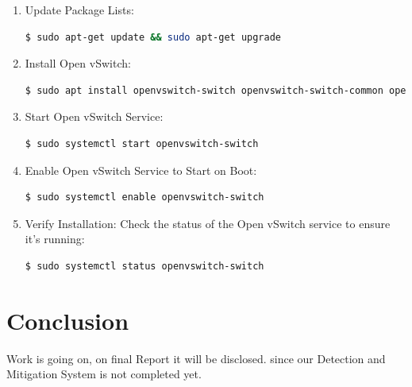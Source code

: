 \documentclass[12pt,twocolumn]{article}
\begin{document}
\begin{enumerate}
    \item Update Package Lists:
        \begin{lstlisting}[language=bash]
            $ sudo apt-get update && sudo apt-get upgrade
        \end{lstlisting}

    \item Install Open vSwitch:
        \begin{lstlisting}[language=bash]
            $ sudo apt install openvswitch-switch openvswitch-switch-common openvswitch-switch-ldpg
        \end{lstlisting}
    \item Start Open vSwitch Service:
        \begin{lstlisting}[language=bash]
           $ sudo systemctl start openvswitch-switch
        \end{lstlisting}
        
    \item Enable Open vSwitch Service to Start on Boot:
        \begin{lstlisting}[language=bash]
           $ sudo systemctl enable openvswitch-switch
        \end{lstlisting}
    \item Verify Installation: Check the status of the Open vSwitch service to ensure it's running:

    \begin{lstlisting}[language=bash]
           $ sudo systemctl status openvswitch-switch
        \end{lstlisting}

    
\end{enumerate}


\section{Conclusion}
Work is going on, on final Report it will be disclosed.
since our Detection and Mitigation System is not completed yet.



\newpage
{}
\end{document}
